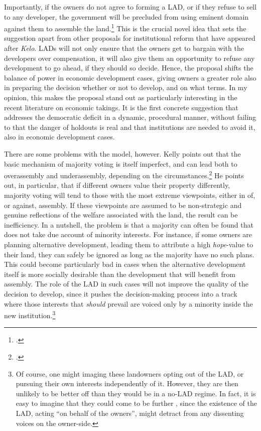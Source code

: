 Importantly, if the owners do not agree to forming a LAD, or if they refuse to sell to any developer, the government will be precluded from using eminent domain against them to assemble the land.\footcite[1491]{heller08} This is the crucial novel idea that sets the suggestion apart from other proposals for institutional reform that have appeared after {\it Kelo}. LADs will not only ensure that the owners get to bargain with the developers over compensation, it will also give them an opportunity to refuse any development to go ahead, if they should so decide. Hence, the proposal shifts the balance of power in economic development cases, giving owners a greater role also in preparing the decision whether or not to develop, and on what terms. In my opinion, this makes the proposal stand out as particularly interesting in the recent literature on economic takings. It is the first concrete suggestion that addresses the democratic deficit in a dynamic, procedural manner, without failing to  that the danger of holdouts is real and that institutions are needed to avoid it, also in economic development cases.

There are some problems with the model, however. Kelly points out that the basic mechanism of majority voting is itself imperfect, and can lead both to overassembly and underassembly, depending on the circumstances.\footcite{kelly09} He points out, in particular, that if different owners value their property differently, majority voting will tend to  those with the most extreme viewpoints, either in  of, or against, assembly. If these viewpoints are assumed to be non-strategic and genuine reflections of the welfare associated with the land, the result can be inefficiency. In a nutshell, the problem is that a majority can often be found that does not take due account of minority interests. For instance, if some owners are planning alternative development, leading them to attribute a high {\it hope}-value to their land, they can safely be ignored as long as the majority have no such plans. This could become particularly bad in cases when the alternative development itself is more socially desirable than the development that will benefit from assembly. The role of the LAD in such cases will not improve the quality of the decision to develop, since it pushes the decision-making process into a track where those interests that {\it should} prevail are voiced only by a  minority inside the new institution.\footnote{Of course, one might imaging these landowners opting out of the LAD, or pursuing their own interests independently of it. However, they are then unlikely to be better off than they would be in a no-LAD regime. In fact, it is easy to imagine that they could come to be further , since the existence of the LAD, acting ``on behalf of the owners'', might detract from any dissenting voices on the owner-side.}

